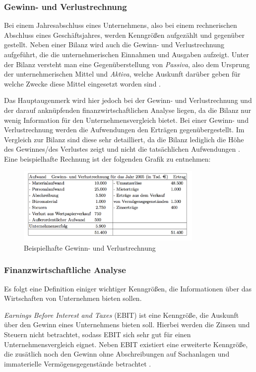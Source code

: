 \subsubsection{Gewinn- und Verlustrechnung}

Bei einem Jahresabschluss eines Unternehmens, also bei einem rechnerischen Abschluss eines Geschäftsjahres, werden Kenngrößen aufgezählt und gegenüber gestellt. Neben einer Bilanz wird auch die Gewinn- und Verlustrechnung aufgeführt, die die unternehmerischen Einnahmen und Ausgaben aufzeigt. Unter der Bilanz versteht man eine Gegenüberstellung von \textit{Passiva}, also dem Ursprung der unternehmerischen Mittel und \textit{Aktiva}, welche Auskunft darüber geben für welche Zwecke diese Mittel eingesetzt worden sind \cite{muller}. 

Das Hauptaugenmerk wird hier jedoch bei der Gewinn- und Verlustrechnung und der darauf anknüpfenden finanzwirtschaftlichen Analyse liegen, da die Bilanz nur wenig Information für den Unternehmensvergleich bietet. Bei einer Gewinn- und Verlustrechnung werden die Aufwendungen den Erträgen gegenübergestellt. Im Vergleich zur Bilanz sind diese sehr detailliert, da die Bilanz lediglich die Höhe des Gewinnes/des Verlustes zeigt und nicht die tatsächlichen Aufwendungen \cite{muller}. Eine beispielhafte Rechnung ist der folgenden Grafik zu entnehmen:


\begin{figure}[H]
\centering
\includegraphics[width=0.8\textwidth]{pictures/guv.png}
\caption{Beispielhafte Gewinn- und Verlustrechnung \cite{muller}}
\label{fig:guv}
\end{figure}

\subsubsection{Finanzwirtschaftliche Analyse}

Es folgt eine Definition einiger wichtiger Kenngrößen, die Informationen über das Wirtschaften von Unternehmen bieten sollen. 

\textit{Earnings Before Interest and Taxes} (EBIT) ist eine Kenngröße, die Auskunft über den Gewinn eines Unternehmens bieten soll. Hierbei werden die Zinsen und Steuern nicht betrachtet, sodass EBIT sich sehr gut für einen Unternehmensvergleich eignet. Neben EBIT existiert eine erweiterte Kenngröße, die zusätlich noch den Gewinn ohne Abschreibungen auf Sachanlagen und immaterielle Vermögensgegenstände betrachtet \cite{bwlformeln}.

